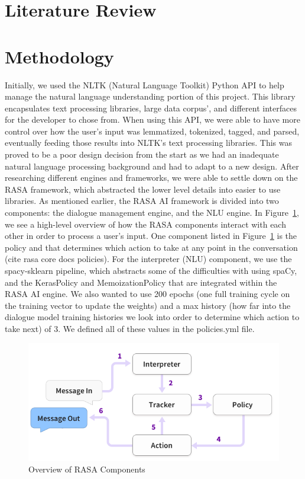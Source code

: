 \documentclass[conference]{IEEEtran}
\begin{document}
\section*{Literature Review}

\section*{Methodology}
Initially, we used the NLTK (Natural Language Toolkit) Python API to help manage the natural language understanding portion of this project. This library encapsulates text processing libraries, large data corpus’, and different interfaces for the developer to chose from. When using this API, we were able to have more control over how the user’s input was lemmatized, tokenized, tagged, and parsed, eventually feeding those results into NLTK’s text processing libraries. This was proved to be a poor design decision from the start as we had an inadequate natural language processing background and had to adapt to a new design. After researching different engines and frameworks, we were able to settle down on the RASA framework, which abstracted the lower level details into easier to use libraries. As mentioned earlier, the RASA AI framework is divided into two components: the dialogue management engine, and the NLU engine. In Figure~\ref{fig:ex1}, we see a high-level overview of how the RASA components interact with each other in order to process a user's input. One component listed in Figure~\ref{fig:ex1} is the policy and that determines which action to take at any point in the conversation (cite rasa core docs policies). For the interpreter (NLU) component, we use the spacy-sklearn pipeline, which abstracts some of the difficulties with using spaCy, and the KerasPolicy and MemoizationPolicy that are integrated within the RASA AI engine. We also wanted to use 200 epochs (one full training cycle on the training vector to update the weights) and a max history (how far into the dialogue model training histories we look into order to determine which action to take next) of 3. We defined all of these values in the policies.yml file.

\begin{figure}
        \includegraphics[scale=0.35]{rasa_nlu.png}
	\caption{ Overview of RASA Components }
	\label{fig:ex1}
\end{figure}
\end{document}
